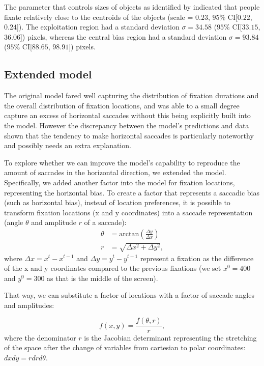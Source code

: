 \documentclass{article}
\begin{document}
The parameter that controls sizes of objects as identified by \citet{xu2014beyond} indicated that people fixate relatively close to the centroids of the objects (scale = $0.23$, $95\%$ CI[$0.22$, $0.24$]). The exploitation region had a standard deviation $\sigma = 34.58$ ($95\%$ CI[$33.15$, $36.06$]) pixels, whereas the central bias region had a standard deviation $\sigma = 93.84$ ($95\%$ CI[$88.65$, $98.91$]) pixels.

\subsection{Extended model}

The original model fared well capturing the distribution of fixation durations and the overall distribution of fixation locations, and was able to a small degree capture an excess of horizontal saccades without this being explicitly built into the model. However the discrepancy between the model's predictions and data shown that the tendency to make horizontal saccades is particularly noteworthy and possibly needs an extra explanation.

To explore whether we can improve the model's capability to reproduce the amount of saccades in the horizontal direction, we extended the model. Specifically, we added another factor into the model for fixation locations, representing the horizontal bias. To create a factor that represents a saccadic bias (such as horizontal bias), instead of location preferences, it is possible to transform fixation locations (x and y coordinates) into a saccade representation (angle $\theta$ and amplitude $r$ of a saccade):
\begin{equation}
    \begin{aligned}
      \theta & = \text{arctan}\left(\frac{\Delta y}{\Delta x}\right) \\
      r & = \sqrt{\Delta x^2 + \Delta y^2},
    \end{aligned}
\end{equation}
where $\Delta x = x^t - x^{t-1}$ and $\Delta y = y^t - y^{t-1}$ represent a fixation as the difference of the x and y coordinates compared to the previous fixations (we set $x^0 = 400$ and $y^0 = 300$ as that is the middle of the screen).

That way, we can substitute a factor of locations with a factor of saccade angles and amplitudes:

\begin{equation}
    f(x, y) = \frac{f(\theta, r)}{r},
\end{equation}
where the denominator $r$ is the Jacobian determinant representing the stretching of the space after the change of variables from cartesian to polar coordinates: $dx dy = r dr d\theta$. 
\end{document}
